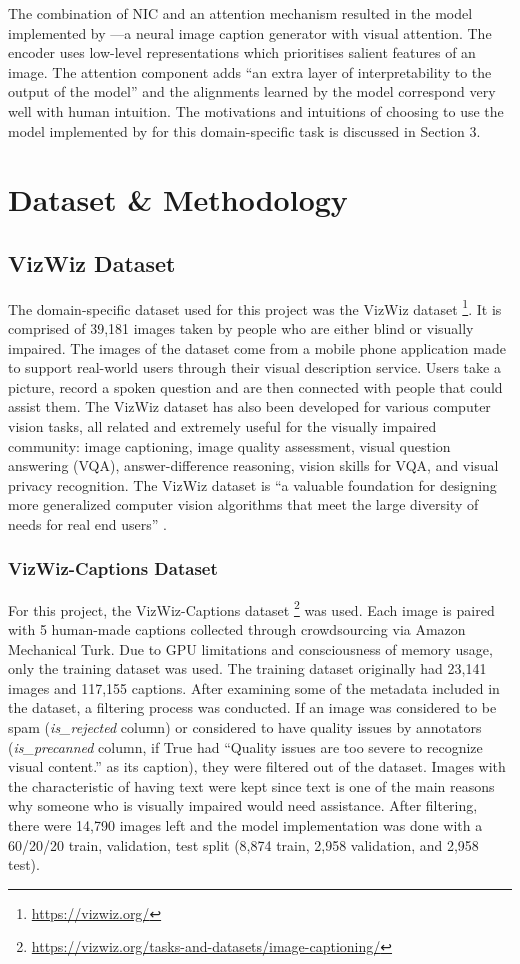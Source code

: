 \documentclass[11pt,a4paper]{article}
\begin{document}
The combination of NIC and an attention mechanism resulted in the model implemented by \citet{Xu-2015-show-attend}—a neural image caption generator with visual attention. The encoder uses low-level representations which prioritises salient features of an image. The attention component adds “an extra layer of interpretability to the output of the model” \citep{Xu-2015-show-attend} and the alignments learned by the model correspond very well with human intuition. The motivations and intuitions of choosing to use the model implemented by \citet{Xu-2015-show-attend} for this domain-specific task is discussed in Section 3. 


\section{Dataset \& Methodology}
\subsection{VizWiz Dataset}
The domain-specific dataset used for this project was the VizWiz dataset \footnote{\url{https://vizwiz.org/}}. It is comprised of 39,181 images taken by people who are either blind or visually impaired. The images of the dataset come from a mobile phone application made to support real-world users through their visual description service. Users take a picture, record a spoken question and are then connected with people that could assist them. The VizWiz dataset has also been developed for various computer vision tasks, all related and extremely useful for the visually impaired community: image captioning, image quality assessment, visual question answering (VQA), answer-difference reasoning, vision skills for VQA, and visual privacy recognition. The VizWiz dataset is “a valuable foundation for designing more generalized computer vision algorithms that meet the large diversity of needs for real end users” \citep{Gurari-2020-captioning}. 

\subsubsection{VizWiz-Captions Dataset}
For this project, the VizWiz-Captions dataset \footnote{\url{https://vizwiz.org/tasks-and-datasets/image-captioning/}} was used. Each image is paired with 5 human-made captions collected through crowdsourcing via Amazon Mechanical Turk. Due to GPU limitations and consciousness of memory usage, only the training dataset was used. The training dataset originally had 23,141 images and 117,155 captions. After examining some of the metadata included in the dataset, a filtering process was conducted. If an image was considered to be spam (\emph{is\_rejected} column) or considered to have quality issues by annotators (\emph{is\_precanned} column, if True had “Quality issues are too severe to recognize visual content.” as its caption), they were filtered out of the dataset. Images with the characteristic of having text were kept since text is one of the main reasons why someone who is visually impaired would need assistance. After filtering, there were 14,790 images left and the model implementation was done with a 60/20/20 train, validation, test split (8,874 train, 2,958 validation, and 2,958 test).
\end{document}
